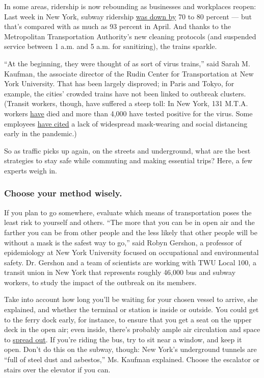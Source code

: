 In some areas, ridership is now rebounding as businesses and workplaces
reopen: Last week in New York, subway ridership
\href{https://new.mta.info/coronavirus/ridership}{was down by} 70 to 80
percent --- but that's compared with as much as 93 percent in April. And
thanks to the Metropolitan Transportation Authority's new cleaning
protocols (and suspended service between 1 a.m. and 5 a.m. for
sanitizing), the trains sparkle.

``At the beginning, they were thought of as sort of virus trains,'' said
Sarah M. Kaufman, the associate director of the Rudin Center for
Transportation at New York University. That has been largely disproved;
in Paris and Tokyo, for example, the cities' crowded trains have not
been linked to outbreak clusters. (Transit workers, though, have
suffered a steep toll: In New York, 131 M.T.A. workers
\href{https://www.nytimes.com/interactive/2020/07/26/nyregion/nyc-covid-19-mta-transit-workers.html}{have}
died and more than 4,000 have tested positive for the virus. Some
employees
\href{https://www.nytimes.com/2020/04/08/nyregion/coronavirus-nyc-mta-subway.html}{have
cited} a lack of widespread mask-wearing and social distancing early in
the pandemic.)

So as traffic picks up again, on the streets and underground, what are
the best strategies to stay safe while commuting and making essential
trips? Here, a few experts weigh in.

\hypertarget{choose-your-method-wisely}{%
\subsubsection{Choose your method
wisely.}\label{choose-your-method-wisely}}

If you plan to go somewhere, evaluate which means of transportation
poses the least risk to yourself and others. ``The more that you can be
in open air and the farther you can be from other people and the less
likely that other people will be without a mask is the safest way to
go,'' said Robyn Gershon, a professor of epidemiology at New York
University focused on occupational and environmental safety. Dr. Gershon
and a team of scientists are working with TWU Local 100, a transit union
in New York that represents roughly 46,000 bus and subway workers, to
study the impact of the outbreak on its members.

Take into account how long you'll be waiting for your chosen vessel to
arrive, she explained, and whether the terminal or station is inside or
outside. You could get to the ferry dock early, for instance, to ensure
that you get a seat on the upper deck in the open air; even inside,
there's probably ample air circulation and space to
\href{https://twitter.com/vinbarone/status/1270470612071440386}{spread
out}. If you're riding the bus, try to sit near a window, and keep it
open. Don't do this on the subway, though: New York's underground
tunnels are ``full of steel dust and asbestos,'' Ms. Kaufman explained.
Choose the escalator or stairs over the elevator if you can.

